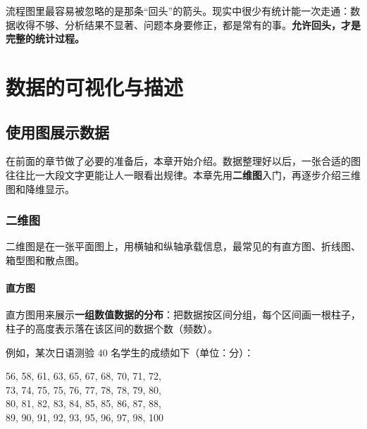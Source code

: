 \documentclass[lang=cn,10pt]{elegantbook}
\begin{document}
\begin{remark}
流程图里最容易被忽略的是那条“回头”的箭头。现实中很少有统计能一次走通：数据收得不够、分析结果不显著、问题本身要修正，都是常有的事。\textbf{允许回头，才是完整的统计过程。}
\end{remark}









\chapter{数据的可视化与描述}


\section{使用图展示数据}
在前面的章节做了必要的准备后，本章开始介绍。数据整理好以后，一张合适的图往往比一大段文字更能让人一眼看出规律。本章先用\textbf{二维图}入门，再逐步介绍三维图和降维显示。

\subsection{二维图}
二维图是在一张平面图上，用横轴和纵轴承载信息，最常见的有直方图、折线图、箱型图和散点图。

\subsubsection{直方图}
直方图用来展示\textbf{一组数值数据的分布}：把数据按区间分组，每个区间画一根柱子，柱子的高度表示落在该区间的数据个数（频数）。

例如，某次日语测验 40 名学生的成绩如下（单位：分）：
\begin{center}
56, 58, 61, 63, 65, 67, 68, 70, 71, 72,\\
73, 74, 75, 75, 76, 77, 78, 78, 79, 80,\\
80, 81, 82, 83, 84, 85, 85, 86, 87, 88,\\
89, 90, 91, 92, 93, 95, 96, 97, 98, 100
\end{center}
\end{document}
